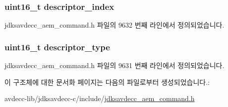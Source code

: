 \subsubsection[{\texorpdfstring{descriptor\+\_\+index}{descriptor_index}}]{\setlength{\rightskip}{0pt plus 5cm}uint16\+\_\+t descriptor\+\_\+index}\hypertarget{structjdksavdecc__aem__command__get__sensor__format_a042bbc76d835b82d27c1932431ee38d4}{}\label{structjdksavdecc__aem__command__get__sensor__format_a042bbc76d835b82d27c1932431ee38d4}


jdksavdecc\+\_\+aem\+\_\+command.\+h 파일의 9632 번째 라인에서 정의되었습니다.

\subsubsection[{\texorpdfstring{descriptor\+\_\+type}{descriptor_type}}]{\setlength{\rightskip}{0pt plus 5cm}uint16\+\_\+t descriptor\+\_\+type}\hypertarget{structjdksavdecc__aem__command__get__sensor__format_ab7c32b6c7131c13d4ea3b7ee2f09b78d}{}\label{structjdksavdecc__aem__command__get__sensor__format_ab7c32b6c7131c13d4ea3b7ee2f09b78d}


jdksavdecc\+\_\+aem\+\_\+command.\+h 파일의 9631 번째 라인에서 정의되었습니다.



이 구조체에 대한 문서화 페이지는 다음의 파일로부터 생성되었습니다.\+:\begin{DoxyCompactItemize}
\item 
avdecc-\/lib/jdksavdecc-\/c/include/\hyperlink{jdksavdecc__aem__command_8h}{jdksavdecc\+\_\+aem\+\_\+command.\+h}\end{DoxyCompactItemize}
